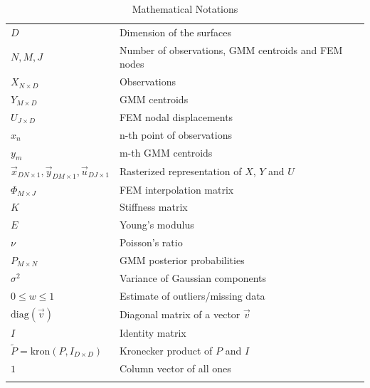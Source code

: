 \documentclass[journal]{IEEEtran}
\newcommand{\diag}{\mathrm{diag}}
\newcommand{\kron}{\mathrm{kron}}
\begin{document}
\begin{table}[!bht]
  \centering
  \caption{Mathematical Notations \label{tbl:notation}}
  \begin{tabular}{lp{}}
  \hline
    $D$ & Dimension of the surfaces\\
    $N,M,J$ & Number of observations, GMM centroids and FEM nodes\\
    $X_{N\times D}$ & Observations\\
    $Y_{M\times D}$ & GMM centroids\\
    $U_{J\times D}$ & FEM nodal displacements\\
    $x_n$ & n-th point of observations\\
    $y_m$ & m-th GMM centroids\\
    $\vec{x}_{DN \times 1},\vec{y}_{DM \times 1},\vec{u}_{DJ \times 1}$ & Rasterized representation of $X$, $Y$ and $U$\\
    $\Phi_{M\times J}$ & FEM interpolation matrix\\
    $K$ & Stiffness matrix\\
    $E$ & Young's modulus\\
    $\nu$ & Poisson's ratio\\
    $P_{M\times N}$ & GMM posterior probabilities\\ 
    $\sigma^2$ & Variance of Gaussian components\\
    $0{\leq}w{\leq}1$ & Estimate of outliers/missing data\\
    $\diag{(\vec{v})}$ & Diagonal matrix of a vector $\vec{v}$\\
    $I$ & Identity matrix\\
    $\tilde{P} = \kron{(P,I_{D\times{D}})}$ &Kronecker product of $P$ and $I$\\
    $1$ & Column vector of all ones\\
    \hline\\
  \end{tabular}
\end{table}
\end{document}
